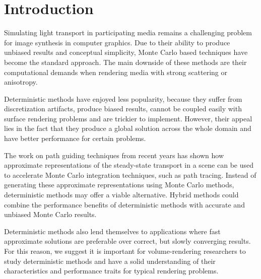 
\section{Introduction}
\vspace{0.1in}

Simulating light transport in participating media remains a challenging problem for image synthesis in computer graphics. Due to their ability to produce unbiased results and conceptual simplicity, Monte Carlo based techniques have become the standard approach. The main downside of these methods are their computational demands when rendering media with strong scattering or anisotropy.

Deterministic methods have enjoyed less popularity, because they suffer from discretization artifacts, produce biased results, cannot be coupled easily with surface rendering problems and are trickier to implement. However, their appeal lies in the fact that they produce a global solution across the whole domain and have better performance for certain problems.

The work on path guiding techniques from recent years has shown how approximate representations of the steady-state transport in a scene can be used to accelerate Monte Carlo integration techniques, such as path tracing. Instead of generating these approximate representations using Monte Carlo methods, deterministic methods may offer a viable alternative. Hybrid methods could combine the performance benefits of deterministic methods with accurate and unbiased Monte Carlo results.

Deterministic methods also lend themselves to applications where fast approximate solutions are preferable over correct, but slowly converging results. For this reason, we suggest it is important for volume-rendering researchers to study deterministic methods and have a solid understanding of their characteristics and performance traits for typical rendering problems.


